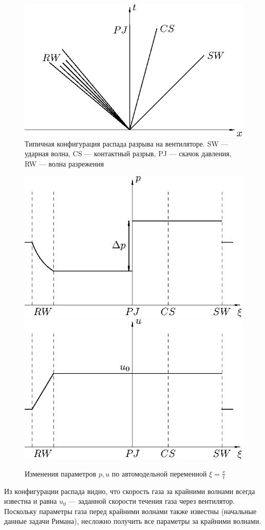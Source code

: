 \documentclass[12pt]{article}
\begin{document}
\begin{figure}[!ht]
\centering
\includegraphics[width=.8\columnwidth]{conf-0.eps}
\caption{Типичная конфигурация распада разрыва на вентиляторе. SW --- ударная волна, CS --- контактный разрыв, PJ --- скачок давления, RW --- волна разрежения}
\end{figure}

\begin{figure}[!ht]
	\centering
	\includegraphics[width=.45\columnwidth]{conf-1.eps} %
	\includegraphics[width=.45\columnwidth]{conf-3.eps} %
	\caption{Изменения параметров $p, u$ по автомодельной переменной $\xi = \frac{x}{t}$}
\end{figure}

Из конфигурации распада видно, что скорость газа за крайними волнами всегда известна и равна $u_0$ --- заданной скорости течения газа через вентилятор. Поскольку параметры газа перед крайними волнами также известны (начальные данные задачи Римана), несложно получить все параметры за крайними волнами. 
\end{document}
